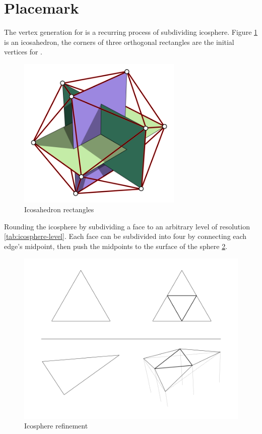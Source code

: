 \section{Placemark}

The vertex generation for  is a recurring process of subdividing icosphere. Figure \ref{fig:icosahedron-rectangles} is an icosahedron, the corners of three orthogonal rectangles are the initial vertices for .

\begin{figure}[H]
\caption[Icosahedron rectangles]{Icosahedron rectangles \cite{wiki.icosahedron-rectangles.2006}}
\label{fig:icosahedron-rectangles}
\centering
\includegraphics[width=0.7\textwidth, keepaspectratio]{Figures/icosahedron-rectangles.png}
\decoRule
\end{figure}

Rounding the icosphere by subdividing a face to an arbitrary level of resolution \ref{tab:icosphere-level}. Each face can be subdivided into four by connecting each edge's midpoint, then push the midpoints to the surface of the sphere \ref{fig:icosphere-refinement}.

\begin{figure}[H]
\caption{Icosphere refinement}
\label{fig:icosphere-refinement}
\centering
\includegraphics[width=\textwidth, keepaspectratio]{Figures/icosphere-refinement.png}
\decoRule
\end{figure}

